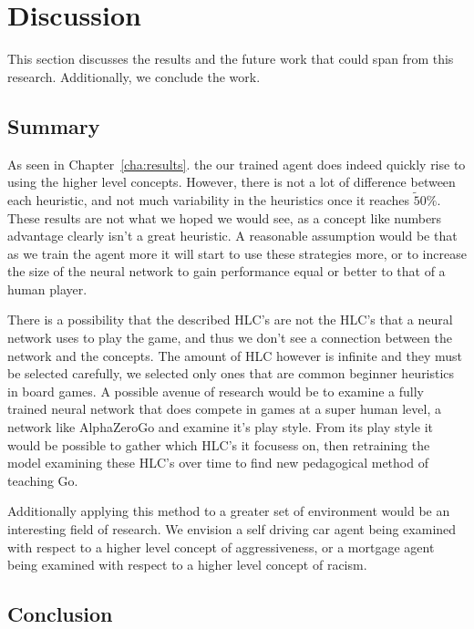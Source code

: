 \chapter{Discussion}


This section discusses the results and the future work that could span from this research. Additionally, we conclude the work.

\section{Summary}

As seen in Chapter~\ref{cha:results}. the our trained agent does indeed quickly rise to using the higher level concepts. However, there is not a lot of difference between each heuristic, and not much variability in the heuristics once it reaches $\tilde50\%$. These results are not what we hoped we would see, as a concept like numbers advantage clearly isn't a great heuristic. A reasonable assumption would be that as we train the agent more it will start to use these strategies more, or to increase the size of the neural network to gain performance equal or better to that of a human player. 

There is a possibility that the described HLC's are not the HLC's that a neural network uses to play the game, and thus we don't see a connection between the network and the concepts. The amount of HLC however is infinite and they must be selected carefully, we selected only ones that are common beginner heuristics in board games. A possible avenue of research would be to examine a fully trained neural network that does compete in games at a super human level, a network like AlphaZeroGo and examine it's play style. From its play style it would be possible to gather which HLC's it focusess on, then retraining the model examining these HLC's over time to find new pedagogical method of teaching Go.

Additionally applying this method to a greater set of environment would be an interesting field of research. We envision a self driving car agent being examined with respect to a higher level concept of aggressiveness, or a mortgage agent being examined with respect to a higher level concept of racism.


\section{Conclusion}


